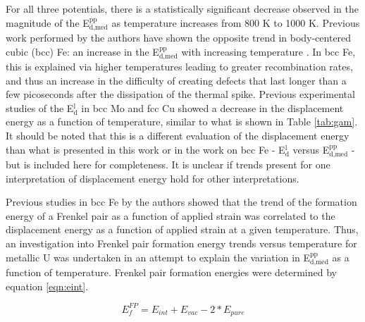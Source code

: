 \documentclass[review]{elsarticle}
\begin{document}
\FloatBarrier

For all three potentials, there is a statistically significant decrease observed in the magnitude of the E$^{\textrm{pp}}_{\textrm{d,med}}$ as temperature increases from 800 K to 1000 K. Previous work performed by the authors have shown the opposite trend in body-centered cubic (bcc) Fe: an increase in the E$^{\textrm{pp}}_{\textrm{d,med}}$ with increasing temperature \cite{beeler2016}. In bcc Fe, this is explained via higher temperatures leading to greater recombination rates, and thus an increase in the difficulty of creating defects that last longer than a few picoseconds after the dissipation of the thermal spike. Previous experimental studies of the E$^{\textrm{l}}_{\textrm{d}}$ in bcc Mo \cite{zag1983} and fcc Cu\cite{yoshida1979} showed a decrease in the displacement energy as a function of temperature, similar to what is shown in Table \ref{tab:gam}. It should be noted that this is a different evaluation of the displacement energy than what is presented in this work or in the work on bcc Fe \cite{beeler2016}- E$^{\textrm{l}}_{\textrm{d}}$ versus E$^{\textrm{pp}}_{\textrm{d,med}}$ - but is included here for completeness. It is unclear if trends present for one interpretation of displacement energy hold for other interpretations. 

Previous studies in bcc Fe \cite{beeler2015, beeler2016} by the authors showed that the trend of the formation energy of a Frenkel pair as a function of applied strain was correlated to the displacement energy as a function of applied strain at a given temperature. Thus, an investigation into Frenkel pair formation energy trends versus temperature for metallic U was undertaken in an attempt to explain the variation in E$^{\textrm{pp}}_{\textrm{d,med}}$ as a function of temperature. Frenkel pair formation energies were determined by equation \ref{eqn:eint}.

\begin{equation}
\label{eqn:eint}
E_{f}^{FP} = E_{int} + E_{vac} - 2*E_{pure}
\end{equation} 
\end{document}
